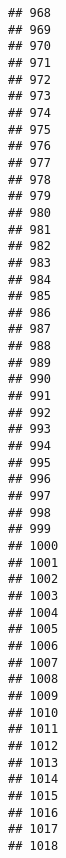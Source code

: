 \documentclass[
]{article}
\begin{document}
\begin{verbatim}
## 968                                            
## 969                                            
## 970                                            
## 971                                            
## 972                                            
## 973                                            
## 974                                            
## 975                                            
## 976                                            
## 977                                            
## 978                                            
## 979                                            
## 980                                            
## 981                                            
## 982                                            
## 983                                            
## 984                                            
## 985                                            
## 986                                            
## 987                                            
## 988                                            
## 989                                            
## 990                                            
## 991                                            
## 992                                            
## 993                                            
## 994                                            
## 995                                            
## 996                                            
## 997                                            
## 998                                            
## 999                                            
## 1000                                           
## 1001                                           
## 1002                                           
## 1003                                           
## 1004                                           
## 1005                                           
## 1006                                           
## 1007                                           
## 1008                                           
## 1009                                           
## 1010                                           
## 1011                                           
## 1012                                           
## 1013                                           
## 1014                                           
## 1015                                           
## 1016                                           
## 1017                                           
## 1018                                           

\end{verbatim}
\end{document}
